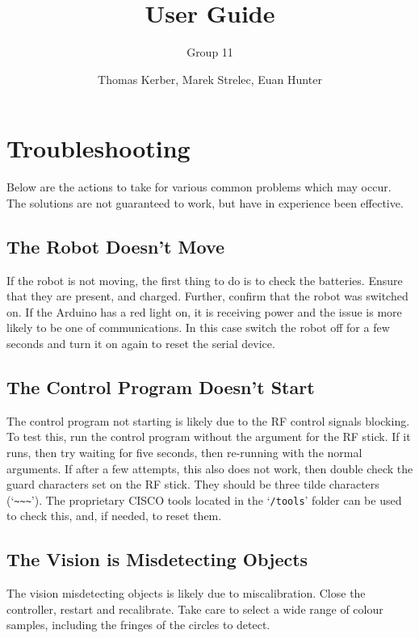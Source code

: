 \documentclass[a4paper,12pt]{scrartcl}
\author{Thomas Kerber, Marek Strelec, Euan Hunter}
\title{User Guide}
\subtitle{Group 11}
\begin{document}
\maketitle





\section{Troubleshooting}

Below are the actions to take for various common problems which may occur. The
solutions are not guaranteed to work, but have in experience been effective.

\subsection{The Robot Doesn't Move}

If the robot is not moving, the first thing to do is to check the batteries.
Ensure that they are present, and charged. Further, confirm that the robot was
switched on. If the Arduino has a red light on, it is receiving power and the
issue is more likely to be one of communications. In this case switch the robot
off for a few seconds and turn it on again to reset the serial device.

\subsection{The Control Program Doesn't Start}

The control program not starting is likely due to the RF control signals
blocking. To test this, run the control program without the argument for the RF
stick. If it runs, then try waiting for five seconds, then re-running with the
normal arguments. If after a few attempts, this also does not work, then double
check the guard characters set on the RF stick. They should be three tilde
characters (`\verb$~~~$'). The proprietary CISCO tools located in the
`\texttt{/tools}' folder can be used to check this, and, if needed, to reset
them.

\subsection{The Vision is Misdetecting Objects}

The vision misdetecting objects is likely due to miscalibration. Close the
controller, restart and recalibrate. Take care to select a wide range of colour
samples, including the fringes of the circles to detect.
\end{document}
